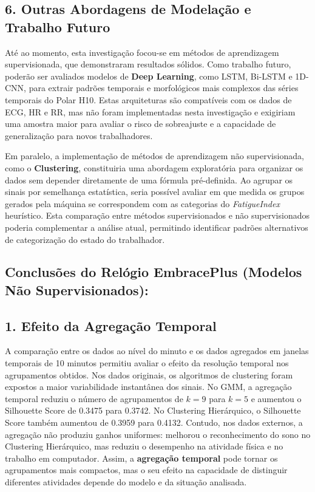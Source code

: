 \subsection*{6. Outras Abordagens de Modelação e Trabalho Futuro}

Até ao momento, esta investigação focou-se em métodos de aprendizagem supervisionada, que demonstraram resultados sólidos. Como trabalho futuro, poderão ser avaliados modelos de \textbf{Deep Learning}, como LSTM, Bi-LSTM e 1D-CNN, para extrair padrões temporais e morfológicos mais complexos das séries temporais do Polar H10. Estas arquiteturas são compatíveis com os dados de ECG, HR e RR, mas não foram implementadas nesta investigação e exigiriam uma amostra maior para avaliar o risco de sobreajuste e a capacidade de generalização para novos trabalhadores.

Em paralelo, a implementação de métodos de aprendizagem não supervisionada, como o \textbf{Clustering}, constituiria uma abordagem exploratória para organizar os dados sem depender diretamente de uma fórmula pré-definida. Ao agrupar os sinais por semelhança estatística, seria possível avaliar em que medida os grupos gerados pela máquina se correspondem com as categorias do \textit{FatigueIndex} heurístico. Esta comparação entre métodos supervisionados e não supervisionados poderia complementar a análise atual, permitindo identificar padrões alternativos de categorização do estado do trabalhador.

\subsection*{Conclusões do Relógio EmbracePlus (Modelos Não Supervisionados):}

\subsection*{1. Efeito da Agregação Temporal}

A comparação entre os dados ao nível do minuto e os dados agregados em janelas temporais de 10 minutos permitiu avaliar o efeito da resolução temporal nos agrupamentos obtidos. Nos dados originais, os algoritmos de clustering foram expostos a maior variabilidade instantânea dos sinais. No GMM, a agregação temporal reduziu o número de agrupamentos de $k=9$ para $k=5$ e aumentou o Silhouette Score de 0.3475 para 0.3742. No Clustering Hierárquico, o Silhouette Score também aumentou de 0.3959 para 0.4132. Contudo, nos dados externos, a agregação não produziu ganhos uniformes: melhorou o reconhecimento do sono no Clustering Hierárquico, mas reduziu o desempenho na atividade física e no trabalho em computador. Assim, a \textbf{agregação temporal} pode tornar os agrupamentos mais compactos, mas o seu efeito na capacidade de distinguir diferentes atividades depende do modelo e da situação analisada.

